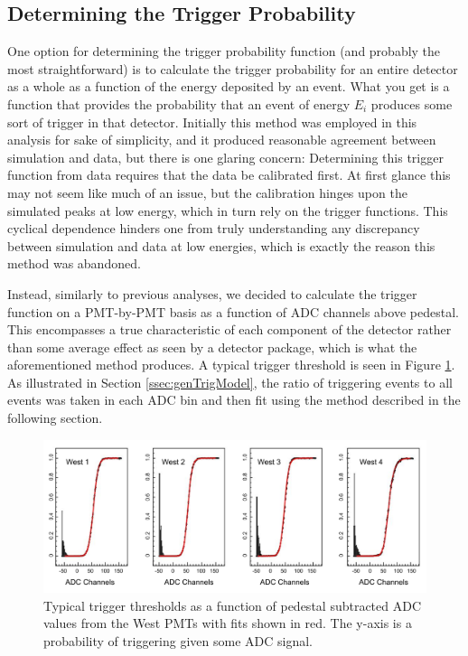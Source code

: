 \subsection{Determining the Trigger Probability}
One option for determining the trigger probability function (and probably the 
most straightforward) is to calculate the trigger probability for an entire detector as 
a whole as a function of the energy deposited by an event. What you get is a 
function that provides the probability that an event of energy $ E_i $ 
produces some sort of trigger in that 
detector. Initially this method was employed in this analysis for sake of simplicity, and it produced 
reasonable agreement between simulation and data, but there is one 
glaring concern: Determining this trigger function from data requires that the data be 
calibrated first. At first glance this may not seem like much of an issue, but the 
calibration hinges upon the 
simulated peaks at low energy, which in turn rely on the trigger functions. This 
cyclical dependence hinders one from truly understanding any discrepancy between 
simulation and data at low energies, which is exactly the reason this method was 
abandoned.  

Instead, similarly to previous analyses, we decided to calculate the trigger
function on a PMT-by-PMT basis as a function of ADC channels above pedestal. This
encompasses a true characteristic of each component of the detector rather than some
average effect as seen by a detector package, which is what the aforementioned 
method produces. A typical trigger threshold is seen in Figure \ref{fig:trigger_thresh}.
As illustrated in Section \ref{ssec:genTrigModel}, the ratio of triggering events
to all events was taken in each ADC bin and then fit using the method described
in the following section.
  

\begin{figure}[h] 
\centering
\includegraphics[scale=.6]{3-UCNAAnalysis/triggerThresholds.pdf}
\caption{Typical trigger thresholds as a function of pedestal subtracted
  ADC values from the West PMTs with fits shown in red. The y-axis
  is a probability of triggering given some ADC signal.}
\label{fig:trigger_thresh}
\end{figure}

